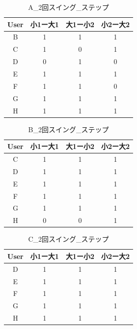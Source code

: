\clearpage
\begin{table}[tb]
    \caption{A\_2回スイング\_ステップ}
    \vspace{0.5cm}
    \centering
    \begin{tabular}{|c|c|c|c|}
        \hline
        User & 小1ー大1 & 大1ー小2 & 小2ー大2 \\ \hline
        B & 1&1&1 \\
        C & 1&0&1 \\
        D & \color{red}0&\color{red}1&\color{red}0 \\
        E & 1&1&1 \\
        F & 1&1&0 \\
        G & 1&1&1 \\
        H & 1&1&1 \\
        \hline
    \end{tabular}
\end{table}
\begin{table}[tb]
    \caption{B\_2回スイング\_ステップ}
    \vspace{0.5cm}
    \centering
    \begin{tabular}{|c|c|c|c|}
        \hline
        User & 小1ー大1 & 大1ー小2 & 小2ー大2 \\\hline
        C & 1&1&1 \\
        D & 1&1&1 \\
        E & 1&1&1 \\
        F & 1&1&1 \\
        G & 1&1&1 \\
        H & \color{red}0&\color{red}0&\color{red}1 \\
        \hline
    \end{tabular}
\end{table}
\begin{table}[tb]
    \caption{C\_2回スイング\_ステップ}
    \vspace{0.5cm}
    \centering
    \begin{tabular}{|c|c|c|c|}
        \hline
        User & 小1ー大1 & 大1ー小2 & 小2ー大2 \\\hline
        D & 1&1&1 \\
        E & 1&1&1 \\
        F & 1&1&1 \\
        G & 1&1&1 \\
        H & 1&1&1 \\
        \hline
    \end{tabular}
\end{table}
